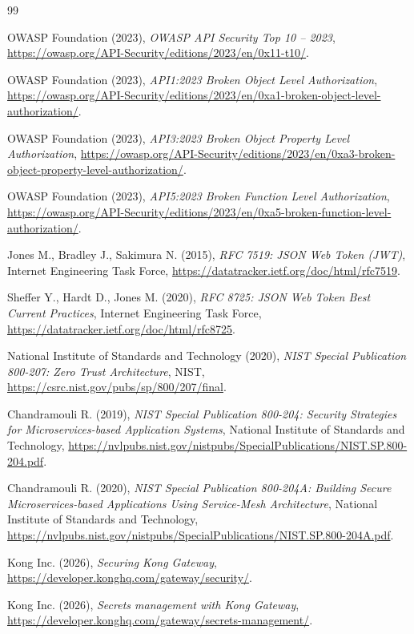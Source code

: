 \documentclass[14pt,a4paper]{extreport}
\begin{document}
\begin{thebibliography}{99}

OWASP Foundation (2023), \textit{OWASP API Security Top 10 -- 2023}, \url{https://owasp.org/API-Security/editions/2023/en/0x11-t10/}.

OWASP Foundation (2023), \textit{API1:2023 Broken Object Level Authorization}, \url{https://owasp.org/API-Security/editions/2023/en/0xa1-broken-object-level-authorization/}.

OWASP Foundation (2023), \textit{API3:2023 Broken Object Property Level Authorization}, \url{https://owasp.org/API-Security/editions/2023/en/0xa3-broken-object-property-level-authorization/}.

OWASP Foundation (2023), \textit{API5:2023 Broken Function Level Authorization}, \url{https://owasp.org/API-Security/editions/2023/en/0xa5-broken-function-level-authorization/}.

Jones M., Bradley J., Sakimura N. (2015), \textit{RFC 7519: JSON Web Token (JWT)}, Internet Engineering Task Force, \url{https://datatracker.ietf.org/doc/html/rfc7519}.

Sheffer Y., Hardt D., Jones M. (2020), \textit{RFC 8725: JSON Web Token Best Current Practices}, Internet Engineering Task Force, \url{https://datatracker.ietf.org/doc/html/rfc8725}.

National Institute of Standards and Technology (2020), \textit{NIST Special Publication 800-207: Zero Trust Architecture}, NIST, \url{https://csrc.nist.gov/pubs/sp/800/207/final}.

Chandramouli R. (2019), \textit{NIST Special Publication 800-204: Security Strategies for Microservices-based Application Systems}, National Institute of Standards and Technology, \url{https://nvlpubs.nist.gov/nistpubs/SpecialPublications/NIST.SP.800-204.pdf}.

Chandramouli R. (2020), \textit{NIST Special Publication 800-204A: Building Secure Microservices-based Applications Using Service-Mesh Architecture}, National Institute of Standards and Technology, \url{https://nvlpubs.nist.gov/nistpubs/SpecialPublications/NIST.SP.800-204A.pdf}.

Kong Inc. (2026), \textit{Securing Kong Gateway}, \url{https://developer.konghq.com/gateway/security/}.

Kong Inc. (2026), \textit{Secrets management with Kong Gateway}, \url{https://developer.konghq.com/gateway/secrets-management/}.


\end{thebibliography}
\end{document}
